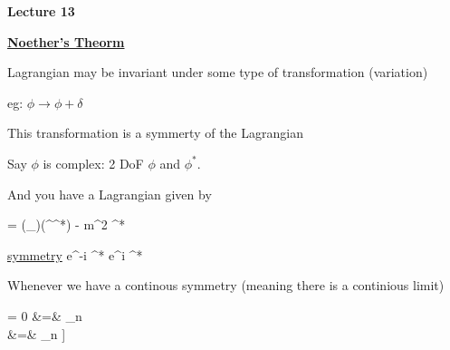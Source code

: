 
\usepackage{braket}
\usepackage{bbm}
\usepackage{relsize}
\usepackage{tcolorbox}



\usepackage{cancel}

\usepackage{fancyhdr}

\fancyhf{}


\thispagestyle{fancy}

\begin{center}
{\huge \textbf{Lecture 13}}
\end{center}

{\fontsize{14}{16}\selectfont

\textbf{\underline{Noether's Theorm}} 

Lagrangian may be invariant under some type of transformation (variation) 

eg: $\phi \rightarrow \phi + \delta$

This transformation is a symmerty of the Lagrangian

Say $\phi$ is complex:  2 DoF  $\phi$ and $\phi^*$.

And you have a Lagrangian given by


\be
{} = (\partial_\mu \phi)(\partial^\mu \phi^*) - m^2 \phi \phi^*
\ee

\underline{symmetry}
\be
\phi \rightarrow e^{-i\alpha} \phi \hspace{1in} \phi^* \rightarrow e^{i\alpha} \phi^*
\ee


Whenever we have a continous symmetry (meaning there is a continious limit)

\bea
{} = 0 &=& \sum_n   \\ 
&=& \sum_n \left[ \underbrace{\left[ \frac{\partial \mathcal{L}}{\partial \phi_n} - \partial_\mu \frac{\partial \mathcal{L}}{\partial (\partial_\mu \phi_n)} \right]}_{=0\ \textrm{Euler Lagrange}} \frac{\delta \phi_n}{\delta \alpha}  +  \partial_\mu \left[ \frac{\partial \mathcal{L}}{\partial (\partial_\mu \phi_n)} \frac{\delta \phi_n}{\delta \alpha} \right] \right]
\eea

}
